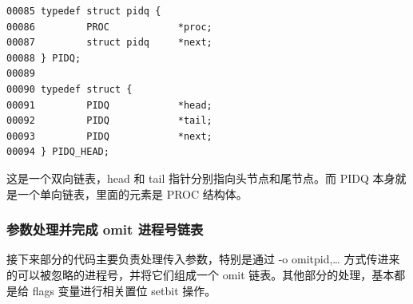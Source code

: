 {\begin{shaded}\begin{verbatim}
00085 typedef struct pidq {
00086         PROC            *proc;
00087         struct pidq     *next;
00088 } PIDQ;
00089 
00090 typedef struct {
00091         PIDQ            *head;
00092         PIDQ            *tail;
00093         PIDQ            *next;
00094 } PIDQ_HEAD;
\end{verbatim}\end{shaded}}
这是一个双向链表，head 和 tail 指针分别指向头节点和尾节点。而 PIDQ
本身就是一个单向链表，里面的元素是 PROC 结构体。

\subsubsection{参数处理并完成 omit 进程号链表}

接下来部分的代码主要负责处理传入参数，特别是通过 -o omitpid,\ldots{}
方式传进来的可以被忽略的进程号，并将它们组成一个 omit
链表。其他部分的处理，基本都是给 flags 变量进行相关置位 setbit 操作。

